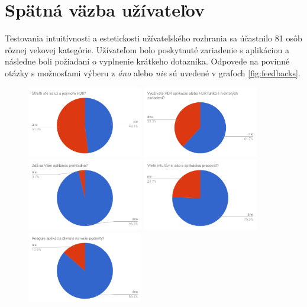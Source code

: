 \section{Spätná väzba užívateľov}

Testovania intuitívnosti a estetickosti užívateľského rozhrania sa účastnilo 81 osôb rôznej vekovej kategórie. Užívateľom
bolo poskytnuté zariadenie s aplikáciou a následne boli požiadaní o vyplnenie krátkeho dotazníka. Odpovede na povinné otázky
s možnosťami výberu z \textit{áno} alebo \textit{nie} sú uvedené v grafoch \ref{fig:feedbacks}.

\begin{figure}[ht!]
  \centering
  \includegraphics[width=0.45\textwidth]{figures/tests/charts/chart0}
	\includegraphics[width=0.45\textwidth]{figures/tests/charts/chart1}
	\includegraphics[width=0.45\textwidth]{figures/tests/charts/chart2}
	\includegraphics[width=0.45\textwidth]{figures/tests/charts/chart3}
	\includegraphics[width=0.45\textwidth]{figures/tests/charts/chart4}

\end{figure}
